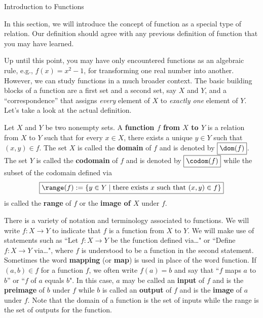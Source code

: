 \begin{section}{Introduction to Functions}

In this section, we will introduce the concept of function as a special type of relation.  Our definition should agree with any previous definition of function that you may have learned.

Up until this point, you may have only encountered functions as an algebraic rule, e.g., $f(x)=x^{2}-1$, for transforming one real number into another.  However, we can study functions in a much broader context.  The basic building blocks of a function are a first set and a second set, say $X$ and $Y$, and a ``correspondence'' that assigns \emph{every} element of $X$ to \emph{exactly one} element of $Y$.  Let's take a look at the actual definition.

\begin{definition}\label{def:function}
Let $X$ and $Y$ be two nonempty sets.  A \textbf{function $f$ from $X$ to $Y$} is a relation from $X$ to $Y$ such that for every $x\in X$, there exists a unique $y\in Y$ such that $(x,y)\in f$. The set $X$ is called the \textbf{domain} of $f$ and is denoted by $\boxed{\dom(f)}$.  The set $Y$ is called the \textbf{codomain} of $f$ and is denoted by $\boxed{\codom(f)}$ while the subset of the codomain defined via
\[
\boxed{\range(f):=\{y\in Y\mid \mbox{there exists }x\mbox{ such that } (x,y)\in f\}}
\]
is called the \textbf{range} of $f$ or the \textbf{image of $X$} under $f$.
\end{definition}

There is a variety of notation and terminology associated to functions. We will write $\boxed{f:X\to Y}$ to indicate that $f$ is a function from $X$ to $Y$. We will make use of statements such as ``Let $f:X\to Y$ be the function defined via\ldots" or ``Define $f:X\to Y$ via\ldots", where $f$ is understood to be a function in the second statement. Sometimes the word \textbf{mapping} (or \textbf{map}) is used in place of the word function.  If $(a,b)\in f$ for a function $f$, we often write $\boxed{f(a)=b}$ and say that ``$f$ maps $a$ to $b$'' or ``$f$ of $a$ equals $b$". In this case, $a$ may be called an \textbf{input} of $f$ and is the \textbf{preimage} of $b$ under $f$ while $b$ is called an \textbf{output} of $f$ and is the \textbf{image} of $a$ under $f$. Note that the domain of a function is the set of inputs while the range is the set of outputs for the function.
 

\end{section}
